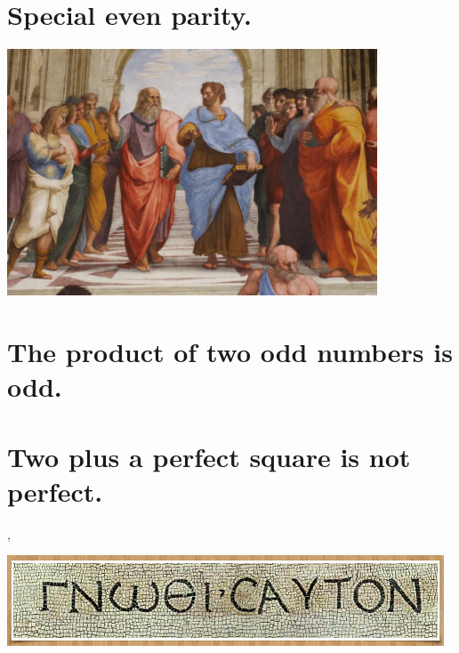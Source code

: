 \documentclass[preview]{standalone}
\begin{document}
\section{Special even parity.}

\begin{center}
    \vspace{1\baselineskip}
    \includegraphics[width=11cm]{../resources/jpg/1.6.introduction.to.proofs/plato-republic.jpg}
\end{center}


\section{The product of two odd numbers is odd.}

\pagebreak


\section{Two plus a perfect square is not perfect.}

\sep
\begin{center}
    \vspace{1\baselineskip}
    \includegraphics[width=13cm]{../resources/jpg/1.6.introduction.to.proofs/know_thyself.jpg}
\end{center}
\pagebreak
\end{document}
